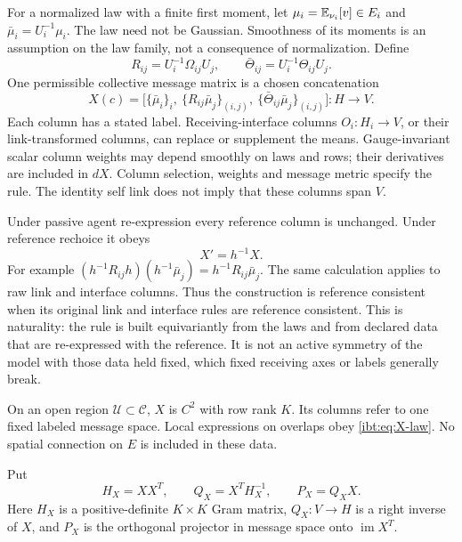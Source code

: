 For a normalized law with a finite first moment, let $\mu_i=\mathbb E_{\nu_i}[v]\in E_i$ and $\bar \mu_i=U_i^{-1}\mu_i$. The law need not be Gaussian. Smoothness of its moments is an assumption on the law family, not a consequence of normalization. Define
\begin{equation}
 R_{ij}=U_i^{-1}\Omega_{ij}U_j,\qquad
 \bar\Theta_{ij}=U_i^{-1}\Theta_{ij}U_j.
\end{equation}
One permissible collective message matrix is a chosen concatenation
\begin{equation}
 X(c)=\bigl[\{\bar \mu_i\}_i,\ \{R_{ij}\bar \mu_j\}_{(i,j)},\
                    \{\bar\Theta_{ij}\bar \mu_j\}_{(i,j)}\bigr]:H\longrightarrow V.
 \label{ibt:eq:X-construction}
\end{equation}
Each column has a stated label. Receiving-interface columns $O_i:H_i\to V$, or their link-transformed columns, can replace or supplement the means. Gauge-invariant scalar column weights may depend smoothly on laws and rows; their derivatives are included in $d X$. Column selection, weights and message metric specify the rule. The identity self link does not imply that these columns span $V$.

Under passive agent re-expression every reference column is unchanged. Under reference rechoice it obeys
\begin{equation}
 X'=h^{-1}X.
 \label{ibt:eq:X-law}
\end{equation}
For example $(h^{-1}R_{ij}h)(h^{-1}\bar \mu_j)=h^{-1}R_{ij}\bar \mu_j$. The same calculation applies to raw link and interface columns. Thus the construction is reference consistent when its original link and interface rules are reference consistent. This is naturality: the rule is built equivariantly from the laws and from declared data that are re-expressed with the reference. It is not an active symmetry of the model with those data held fixed, which fixed receiving axes or labels generally break.

On an open region $\mathcal U\subset\mathcal C$, $X$ is $C^2$ with row rank $K$. Its columns refer to one fixed labeled message space. Local expressions on overlaps obey \cref{ibt:eq:X-law}. No spatial connection on $E$ is included in these data.

Put
\begin{equation}
 H_X=XX^T,\qquad Q_X=X^T H_X^{-1},\qquad P_X=Q_XX.
 \label{ibt:eq:right-inverse}
\end{equation}
Here $H_X$ is a positive-definite $K\times K$ Gram matrix, $Q_X:V\to H$ is a right inverse of $X$, and $P_X$ is the orthogonal projector in message space onto $\operatorname{im}X^T$.

